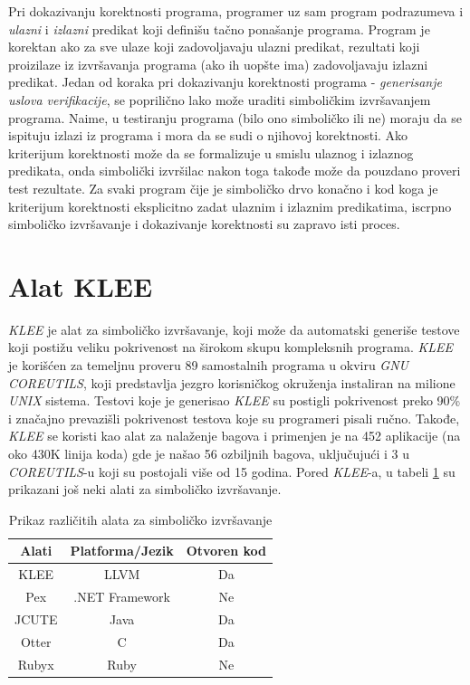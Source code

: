 \documentclass[a4paper]{article}
\begin{document}
Pri dokazivanju korektnosti programa, programer uz sam program podrazumeva i \textit{ulazni} i \textit{izlazni} predikat koji  definišu tačno ponašanje programa. Program je korektan ako za sve ulaze koji zadovoljavaju ulazni predikat, rezultati koji proizilaze iz izvršavanja programa (ako ih uopšte ima) zadovoljavaju izlazni predikat. Jedan od koraka pri dokazivanju korektnosti programa - \textit{generisanje uslova verifikacije}, se poprilično lako može uraditi simboličkim izvršavanjem programa. Naime, u testiranju programa (bilo ono simboličko ili ne) moraju da se ispituju izlazi iz programa i mora da se sudi o njihovoj korektnosti.  Ako kriterijum korektnosti može da se formalizuje u smislu ulaznog i izlaznog predikata, onda simbolički izvršilac nakon toga takođe može da pouzdano proveri test rezultate. Za svaki program čije je simboličko drvo konačno i kod koga je kriterijum korektnosti eksplicitno zadat ulaznim i izlaznim predikatima, iscrpno simboličko izvršavanje i dokazivanje korektnosti su zapravo isti proces.


\section{Alat KLEE}
\label{sec:naslov3}

\textit{KLEE} je alat za simboličko izvršavanje, koji može da automatski generiše testove koji postižu veliku pokrivenost na širokom skupu kompleksnih programa. \textit{KLEE} je korišćen za temeljnu proveru 89 samostalnih programa u okviru \textit{GNU COREUTILS}, koji predstavlja jezgro korisničkog okruženja instaliran na milione \textit{UNIX} sistema. Testovi koje je generisao \textit {KLEE} su postigli pokrivenost preko 90\% i značajno prevazišli pokrivenost testova koje su programeri pisali ručno. Takođe, \textit{KLEE} se koristi kao alat za nalaženje bagova i primenjen je na 452 aplikacije (na oko 430K linija koda) gde je našao 56 ozbiljnih bagova, uključujući i 3 u \textit{COREUTILS}-u koji su postojali više od 15 godina. Pored \textit {KLEE}-a, u tabeli \ref{tab:tabela1} su prikazani još neki alati za simboličko izvršavanje. 


\begin{table}[h!]
\begin{center}
\caption{Prikaz različitih alata za simboličko izvršavanje}
\begin{tabular}{|c|c|c|} \hline
\textbf{Alati} & \textbf{Platforma/Jezik}&  \textbf{Otvoren kod} \\ \hline
KLEE& LLVM& Da\\ \hline
Pex& .NET Framework& Ne\\ \hline
JCUTE& Java& Da\\ \hline
Otter& C& Da\\ \hline
Rubyx& Ruby& Ne\\ \hline
\end{tabular}
\label{tab:tabela1}
\end{center}
\end{table}
\end{document}
